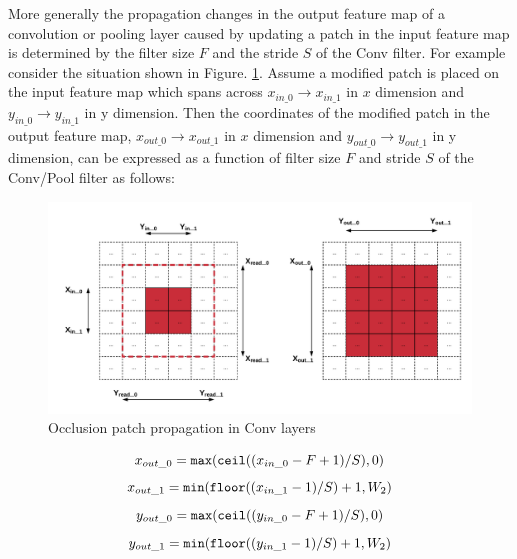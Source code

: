 More generally the propagation changes in the output feature map of a convolution or pooling layer caused by updating a patch in the input feature map is determined by the filter size $F$ and the stride $S$ of the Conv filter.
For example consider the situation shown in Figure. \ref{fig:patch_propagation}.
Assume a modified patch is placed on the input feature map which spans across $x_{in\_0}\rightarrow x_{in\_1}$ in $x$ dimension and $y_{in\_0}\rightarrow y_{in\_1}$ in y dimension.
Then the coordinates of the modified patch in the output feature map,  $x_{out\_0}\rightarrow x_{out\_1}$ in $x$ dimension and $y_{out\_0}\rightarrow y_{out\_1}$ in y dimension, can be expressed as a function of filter size $F$ and stride $S$ of the Conv/Pool filter as follows:

\begin{figure}
  \includegraphics[width=\columnwidth]{./images/patch_propagation}
  \caption{Occlusion patch propagation in Conv layers}
  \label{fig:patch_propagation}
\end{figure}

\begin{equation}
x_{out\_0} = \texttt{max}(\texttt{ceil}((x_{in\_0} - F + 1)/S), 0) \\
\end{equation}
\begin{equation}
x_{out\_1} = \texttt{min}(\texttt{floor}((x_{in\_1} - 1)/S) + 1, W_2) \\
\end{equation}
\begin{equation}
y_{out\_0} = \texttt{max}(\texttt{ceil}((y_{in\_0} - F + 1)/S), 0) \\
\end{equation}
\begin{equation}
y_{out\_1} = \texttt{min}(\texttt{floor}((y_{in\_1} - 1)/S) + 1, W_2)\\
\end{equation}

